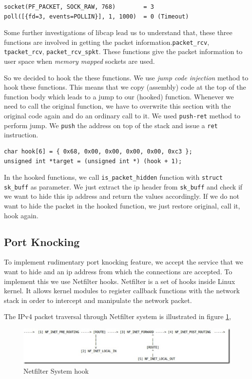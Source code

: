 \documentclass[10pt, letterpaper]{scrartcl}
\begin{document}
\begin{verbatim}
socket(PF_PACKET, SOCK_RAW, 768)        = 3
poll([{fd=3, events=POLLIN}], 1, 1000)  = 0 (Timeout)
\end{verbatim} 

Some further investigations of libcap lead us to understand that, these three functions are involved in getting the packet information.\texttt{packet\_rcv}, \texttt{tpacket\_rcv}, \texttt{packet\_rcv\_spkt}. These functions give the packet information to user space when {\em memory mapped} sockets are used.

So we decided to hook the these functions. 
We use {\em jump code injection} method to hook these functions. This means that we copy (assembly)
code at the top of the function body which leads to a jump to our (hooked) function. Whenever we need to call
the original function, we have to overwrite this section with the original code again and do an ordinary call to
it. We used \texttt{push-ret} method to perform jump. 
We \texttt{push} the address on top of the stack and issue a \texttt{ret} instruction.

\begin{verbatim}
char hook[6] = { 0x68, 0x00, 0x00, 0x00, 0x00, 0xc3 };
unsigned int *target = (unsigned int *) (hook + 1);
\end{verbatim} 

In the hooked functions, we call \texttt{is\_packet\_hidden} function with \texttt{struct sk\_buff} as parameter.
We just extract the ip header from \texttt{sk\_buff} and check if we want to hide this ip address and return the values accordingly. 
If we do not want to hide the packet in the hooked function, we just restore original, call it, hook again. 
  
\subsection{Port Knocking}
To implement rudimentary port knocking feature, we accept the service that we want to hide and an ip address 
from which the connections are accepted. To implement this we use Netfilter hooks. Netfilter is a set of hooks inside Linux kernel. 
It allows kernel modules to register callback functions with the network stack in order to intercept and manipulate the network packet.

The IPv4 packet traversal through Netfilter system is illustrated in figure \ref{netfilter}, 
\begin{figure}
\centerline{
\includegraphics[width=1.0\columnwidth]{netfilter.jpg}
}
\caption{Netfilter System hook}
\label{netfilter}
\end{figure}
\end{document}
